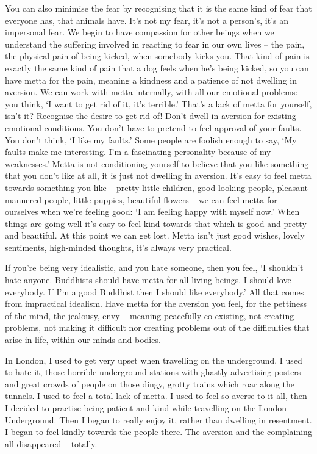 You can also minimise the fear by recognising that it is the same kind of fear that everyone has, that animals have. It's not my fear, it's not a person's, it's an impersonal fear. We begin to have compassion for other beings when we understand the suffering involved in reacting to fear in our own lives -- the pain, the physical pain of being kicked, when somebody kicks you. That kind of pain is exactly the same kind of pain that a dog feels when he's being kicked, so you can have metta for the pain, meaning a kindness and a patience of not dwelling in aversion. We can work with metta internally, with all our emotional problems: you think, `I want to get rid of it, it's terrible.' That's a lack of metta for yourself, isn't it? Recognise the desire-to-get-rid-of! Don't dwell in aversion for existing emotional conditions. You don't have to pretend to feel approval of your faults. You don't think, `I like my faults.' Some people are foolish enough to say, `My faults make me interesting. I'm a fascinating personality because of my weaknesses.' Metta is not conditioning yourself to believe that you like something that you don't like at all, it is just not dwelling in aversion. It's easy to feel metta towards something you like -- pretty little children, good looking people, pleasant mannered people, little puppies, beautiful flowers -- we can feel metta for ourselves when we're feeling good: `I am feeling happy with myself now.' When things are going well it's easy to feel kind towards that which is good and pretty and beautiful. At this point we can get lost. Metta isn't just good wishes, lovely sentiments, high-minded thoughts, it's always very practical.

If you're being very idealistic, and you hate someone, then you feel, `I shouldn't hate anyone. Buddhists should have metta for all living beings. I should love everybody. If I'm a good Buddhist then I should like everybody.' All that comes from impractical idealism. Have metta for the aversion you feel, for the pettiness of the mind, the jealousy, envy -- meaning peacefully co-existing, not creating problems, not making it difficult nor creating problems out of the difficulties that arise in life, within our minds and bodies.

In London, I used to get very upset when travelling on the underground. I used to hate it, those horrible underground stations with ghastly advertising posters and great crowds of people on those dingy, grotty trains which roar along the tunnels. I used to feel a total lack of metta. I used to feel so averse to it all, then I decided to practise being patient and kind while travelling on the London Underground. Then I began to really enjoy it, rather than dwelling in resentment. I began to feel kindly towards the people there. The aversion and the complaining all disappeared -- totally.

